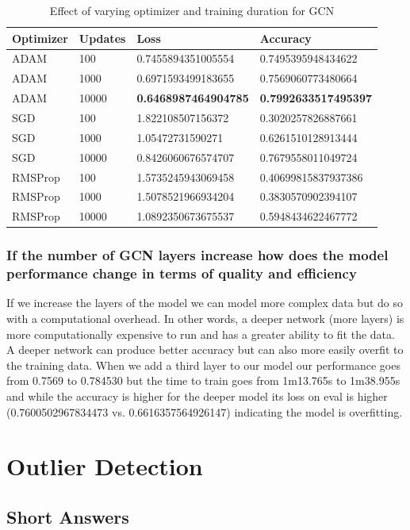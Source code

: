 \documentclass[11pt]{article}
\begin{document}
\begin{table}[]
\begin{tabular}{|l|l|l|l|} \hline
Optimizer & Updates & Loss & Accuracy \\ \hline
ADAM & 100   & 0.7455894351005554 & 0.7495395948434622 \\ \hline
ADAM & 1000   & 0.6971593499183655 & 0.7569060773480664 \\ \hline
ADAM & 10000 & \textbf{0.6468987464904785} & \textbf{0.7992633517495397} \\ \hline
SGD & 100  & 1.822108507156372 & 0.3020257826887661 \\ \hline
SGD & 1000   & 1.05472731590271 & 0.6261510128913444 \\ \hline
SGD & 10000   & 0.8426060676574707 & 0.7679558011049724 \\ \hline
RMSProp & 100  & 1.5735245943069458 & 0.40699815837937386 \\ \hline
RMSProp & 1000  & 1.5078521966934204 & 0.3830570902394107 \\ \hline
RMSProp & 10000  & 1.0892350673675537 & 0.5948434622467772 \\ \hline
\end{tabular}
\caption{Effect of varying optimizer and training duration for GCN}
\label{tab:1de}
\end{table}
\subsubsection{If the number of GCN layers increase how does the model performance change in terms of quality and efficiency}
If we increase the layers of the model we can model more complex data but do so with a computational overhead. In other words, a deeper network (more layers) is more computationally expensive to run and has a greater ability to fit the data. A deeper network can produce better accuracy but can also more easily overfit to the training data. When we add a third layer to our model our performance goes from 0.7569 to 0.784530 but the time to train goes from 1m13.765s to 1m38.955s and while the accuracy is higher for the deeper model its loss on eval is higher (0.7600502967834473 vs. 0.6616357564926147) indicating the model is overfitting.
\section{Outlier Detection}
\subsection{Short Answers}
\end{document}
